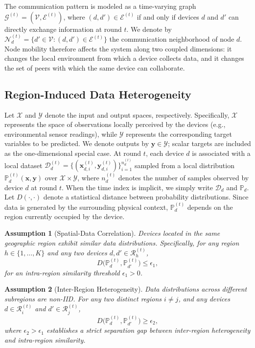 \documentclass[conference]{IEEEtran}
\theoremstyle{plain}
\newtheorem{assumption}{Assumption}
\theoremstyle{definition}
\begin{document}
The communication pattern is modeled as a time-varying graph
 $\mathcal{G}^{(t)} = (\mathcal{V}, \mathcal{E}^{(t)})$,
 where $(d,d') \in \mathcal{E}^{(t)}$ if and only if devices $d$ and $d'$ can directly exchange information at round $t$.
We denote by $\mathcal{N}_d^{(t)} = \{d' \in \mathcal{V} : (d,d') \in \mathcal{E}^{(t)}\}$ the communication neighborhood of node $d$.
Node mobility therefore affects the system along two coupled dimensions:
 it changes the local environment from which a device collects data,
 and it changes the set of peers with which the same device can collaborate.

\subsection{Region-Induced Data Heterogeneity}\label{sec:formalization-data}
Let $\mathcal{X}$ and $\mathcal{Y}$ denote the input and output spaces, respectively.
Specifically, $\mathcal{X}$ represents the space of observations locally perceived by the devices (e.g., environmental sensor readings), while $\mathcal{Y}$ represents the corresponding target variables to be predicted.
We denote outputs by $\mathbf{y} \in \mathcal{Y}$; scalar targets are included as the one-dimensional special case.
At round $t$, each device $d$ is associated with a local dataset
 $\mathcal{D}_d^{(t)} = \{(\mathbf{x}_{d,i}^{(t)}, \mathbf{y}_{d,i}^{(t)})\}_{i=1}^{n_d^{(t)}}$
sampled from a local distribution $\mathbb{P}_d^{(t)}(\mathbf{x},\mathbf{y})$ over $\mathcal{X} \times \mathcal{Y}$, where $n_d^{(t)}$ denotes the number of samples observed by device $d$ at round $t$.
When the time index is implicit, 
we simply write $\mathcal{D}_d$ and $\mathbb{P}_d$.
Let $D(\cdot,\cdot)$ denote a statistical distance between probability distributions.
Since data is generated by the surrounding physical context, 
$\mathbb{P}_d^{(t)}$ depends on the region currently occupied by the device.

\begin{assumption}[Spatial-Data Correlation]\label{asm:spatial-correlation}
Devices located in the same geographic region exhibit similar data distributions.
Specifically, for any region $h \in \{1, \dots, K\}$ and any two devices $d, d' \in \mathcal{R}_h^{(t)}$,
\[
    D\bigl(\mathbb{P}_d^{(t)}, \mathbb{P}_{d'}^{(t)}\bigr) \le \epsilon_1,
\]
for an intra-region similarity threshold $\epsilon_1 > 0$.
\end{assumption}

\begin{assumption}[Inter-Region Heterogeneity]\label{asm:heterogeneity}
Data distributions across different subregions are non-IID.
For any two distinct regions $i \neq j$, and any devices $d \in \mathcal{R}_i^{(t)}$ and $d' \in \mathcal{R}_j^{(t)}$,
\[
    D\bigl(\mathbb{P}_d^{(t)}, \mathbb{P}_{d'}^{(t)}\bigr) \ge \epsilon_2,
\]
where $\epsilon_2 > \epsilon_1$ establishes a strict separation gap between inter-region heterogeneity and intra-region similarity.
\end{assumption}
\end{document}
